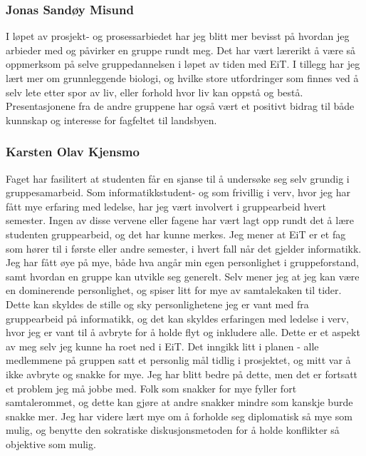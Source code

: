 \subsubsection{Jonas Sandøy Misund}
I løpet av prosjekt- og prosessarbiedet har jeg blitt mer bevisst på hvordan jeg arbieder med og påvirker en gruppe rundt meg.
Det har vært lærerikt å være så oppmerksom på selve gruppedannelsen i løpet av tiden med EiT.
I tillegg har jeg lært mer om grunnleggende biologi, og hvilke store utfordringer som finnes ved å selv lete etter spor av liv, eller forhold hvor liv kan oppstå og bestå.
Presentasjonene fra de andre gruppene har også vært et positivt bidrag til både kunnskap og interesse for fagfeltet til landsbyen.\\
\subsubsection{Karsten Olav Kjensmo}
Faget har fasilitert at studenten får en sjanse til å undersøke seg selv grundig i gruppesamarbeid. 
Som informatikkstudent- og som frivillig i verv, hvor jeg har fått mye erfaring med ledelse, har jeg vært involvert i gruppearbeid hvert semester. 
Ingen av disse vervene eller fagene har vært lagt opp rundt det å lære studenten gruppearbeid, og det har kunne merkes. 
Jeg mener at EiT er et fag som hører til i første eller andre semester, i hvert fall når det gjelder informatikk. 
Jeg har fått øye på mye, både hva angår min egen personlighet i gruppeforstand, samt hvordan en gruppe kan utvikle seg generelt. 
Selv mener jeg at jeg kan være en dominerende personlighet, og spiser litt for mye av samtalekaken til tider. 
Dette kan skyldes de stille og sky personlighetene jeg er vant med fra gruppearbeid på informatikk, og det kan skyldes erfaringen med ledelse i verv, hvor jeg er vant til å avbryte for å holde flyt og inkludere alle. 
Dette er et aspekt av meg selv jeg kunne ha roet ned i EiT. Det inngikk litt i planen - alle medlemmene på gruppen satt et personlig mål tidlig i prosjektet, og mitt var å ikke avbryte og snakke for mye. 
Jeg har blitt bedre på dette, men det er fortsatt et problem jeg må jobbe med. 
Folk som snakker for mye fyller fort samtalerommet, og dette kan gjøre at andre snakker mindre som kanskje burde snakke mer. 
Jeg har videre lært mye om å forholde seg diplomatisk så mye som mulig, og benytte den sokratiske diskusjonsmetoden for å holde konflikter så objektive som mulig.\\

